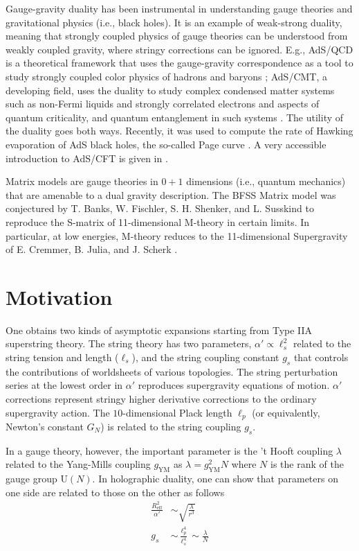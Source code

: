 Gauge-gravity duality has been instrumental in understanding gauge theories and gravitational physics (i.e., black holes). It is an example of weak-strong duality, meaning that strongly coupled physics of gauge theories can be understood from weakly coupled gravity, where stringy corrections can be ignored. E.g., AdS/QCD is a theoretical framework that uses the gauge-gravity correspondence as a tool to study strongly coupled color physics of hadrons and baryons \cite{Casalderrey-Solana:2011dxg,Kim:2012ey}; AdS/CMT, a developing field, uses the duality to study complex condensed matter systems such as non-Fermi liquids and strongly correlated electrons and aspects of quantum criticality, and quantum entanglement in such systems \cite{Sachdev:2010ch,Jensen:2010em}. The utility of the duality goes both ways. Recently, it was used to compute the rate of Hawking evaporation of AdS black holes, the so-called Page curve \cite{Almheiri_2020,Gautason:2020tmk,Cadoni:2021ypx}. A very accessible introduction to AdS/CFT is given in \cite{Pinaki}.

Matrix models are gauge theories in $0+1$ dimensions (i.e., quantum mechanics) that are amenable to a dual gravity description. The BFSS Matrix model was conjectured by T. Banks, W. Fischler, S. H. Shenker, and L. Susskind \cite{Banks:1996vh} to reproduce the S-matrix of 11-dimensional M-theory in certain limits. In particular, at low energies, M-theory reduces to the 11-dimensional Supergravity of E. Cremmer, B. Julia, and J. Scherk \cite{Cremmer:1978km}.

\section{Motivation}

One obtains two kinds of asymptotic expansions starting from Type IIA superstring theory. The string theory has two parameters, $\alpha' \propto \ell_s^2$ related to the string tension and length ($\ell_s$), and the string coupling constant $g_s$ that controls the contributions of worldsheets of various topologies. The string perturbation series at the lowest order in $\alpha'$ reproduces supergravity equations of motion. $\alpha'$ corrections represent stringy higher derivative corrections to the ordinary supergravity action. The $10$-dimensional Plack length $\ell_p$ (or equivalently, Newton's constant $G_N$) is related to the string coupling $g_s$. 

In a gauge theory, however, the important parameter is the 't Hooft coupling $\lambda$ related to the Yang-Mills coupling $g_{\mathrm{YM}}$ as $\lambda = g_\mathrm{YM}^2 N$ where $N$ is the rank of the gauge group $\mathrm{U}(N)$. In holographic duality, one can show that parameters on one side are related to those on the other as follows
\begin{align}\label{eqn:duality-parameters}
  \frac{R_\mathrm{eff}^2}{\alpha'} &\sim \sqrt{\frac{\lambda}{r^3}} \\
  g_s &\sim \frac{\ell_p^4}{\ell_s^4} \sim \frac{\lambda}{N}
\end{align}

